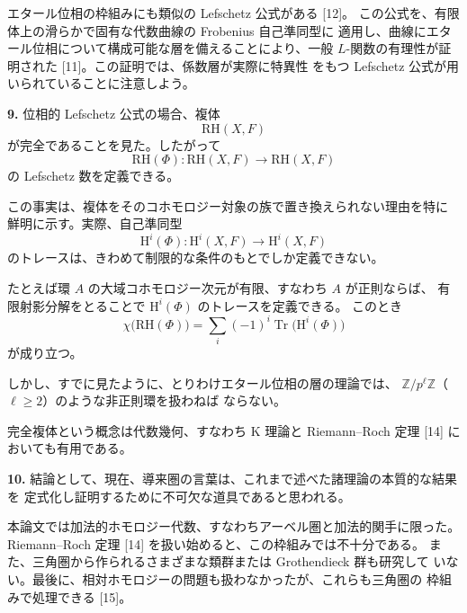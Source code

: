 \clearpage
{}
エタール位相の枠組みにも類似の Lefschetz 公式がある [12]。
この公式を、有限体上の滑らかで固有な代数曲線の Frobenius 自己準同型に
適用し、曲線にエタール位相について構成可能な層を備えることにより、一般
$L$-関数の有理性が証明された [11]。この証明では、係数層が実際に特異性
をもつ Lefschetz 公式が用いられていることに注意しよう。

\noindent\textbf{9.}\quad
位相的 Lefschetz 公式の場合、複体
\[
\mathrm{RH}(X,F)
\]
が完全であることを見た。したがって
\[
\mathrm{RH}(\Phi)\colon
\mathrm{RH}(X,F)\longrightarrow\mathrm{RH}(X,F)
\]
の Lefschetz 数を定義できる。

この事実は、複体をそのコホモロジー対象の族で置き換えられない理由を特に
鮮明に示す。実際、自己準同型
\[
\mathrm{H}^i(\Phi)\colon
\mathrm{H}^i(X,F)\longrightarrow\mathrm{H}^i(X,F)
\]
のトレースは、きわめて制限的な条件のもとでしか定義できない。

たとえば環 $A$ の大域コホモロジー次元が有限、すなわち $A$ が正則ならば、
有限射影分解をとることで $\mathrm{H}^i(\Phi)$ のトレースを定義できる。
このとき
\[
\chi\bigl(\mathrm{RH}(\Phi)\bigr)
=\sum_i(-1)^i\operatorname{Tr}\bigl(\mathrm{H}^i(\Phi)\bigr)
\]
が成り立つ。

しかし、すでに見たように、とりわけエタール位相の層の理論では、
$\mathbb{Z}/p^\ell\mathbb{Z}$（$\ell\geq 2$）のような非正則環を扱わねば
ならない。

完全複体という概念は代数幾何、すなわち K 理論と Riemann--Roch 定理
[14] においても有用である。

\noindent\textbf{10.}\quad
結論として、現在、導来圏の言葉は、これまで述べた諸理論の本質的な結果を
定式化し証明するために不可欠な道具であると思われる。

本論文では加法的ホモロジー代数、すなわちアーベル圏と加法的関手に限った。
Riemann--Roch 定理 [14] を扱い始めると、この枠組みでは不十分である。
また、三角圏から作られるさまざまな類群または Grothendieck 群も研究して
いない。最後に、相対ホモロジーの問題も扱わなかったが、これらも三角圏の
枠組みで処理できる [15]。
